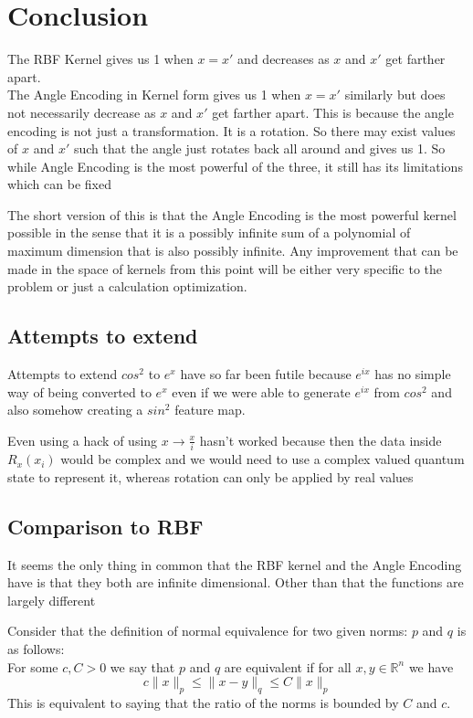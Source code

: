 \documentclass[hidelinks]{book}
\numberwithin{equation}{section}
\begin{document}
\section{Conclusion}
The RBF Kernel gives us 1 when $x = x'$ and decreases as $x$ and $x'$ get farther apart. \\

The Angle Encoding in Kernel form gives us 1 when $x = x'$ similarly but does not necessarily
decrease as $x$ and $x'$ get farther apart. This is because the angle encoding is not just a
transformation. It is a rotation. So there may exist values of $x$ and $x'$ such that the angle
just rotates back all around and gives us 1. So while Angle Encoding is the most powerful of the
three, it still has its limitations which can be fixed

The short version of this is that the Angle Encoding is the most powerful kernel possible
in the sense that it is a possibly infinite sum of a polynomial of maximum dimension that
is also possibly infinite. Any improvement that can be made in the space of kernels from this
point will be either very specific to the problem or just a calculation optimization.

\subsection{Attempts to extend}
Attempts to extend $cos^2$ to $e^x$ have so far been futile because $e^{ix}$ has no simple way
of being converted to $e^x$ even if we were able to generate $e^{ix}$ from $cos^2$ and also somehow
creating a $sin^2$ feature map.

Even using a hack of using $x \rightarrow \frac{x}{i}$ hasn't worked because then the data inside $R_x(x_i)$
would be complex and we would need to use a complex valued quantum state to represent it, whereas rotation can
only be applied by real values

\subsection{Comparison to RBF}
It seems the only thing in common that the RBF kernel and the Angle Encoding have is that they both
are infinite dimensional. Other than that the functions are largely different

Consider that the definition of normal equivalence for two given norms: $p$ and $q$ is as follows:\\
For some $c,C > 0$ we say that $p$ and $q$ are equivalent if for all $x,y \in \mathbb{R}^n$ we have
$$c\|x\|_p \leq \|x-y\|_q \leq C\|x\|_p$$
This is equivalent to saying that the ratio of the norms is bounded by $C$ and $c$.
\end{document}
